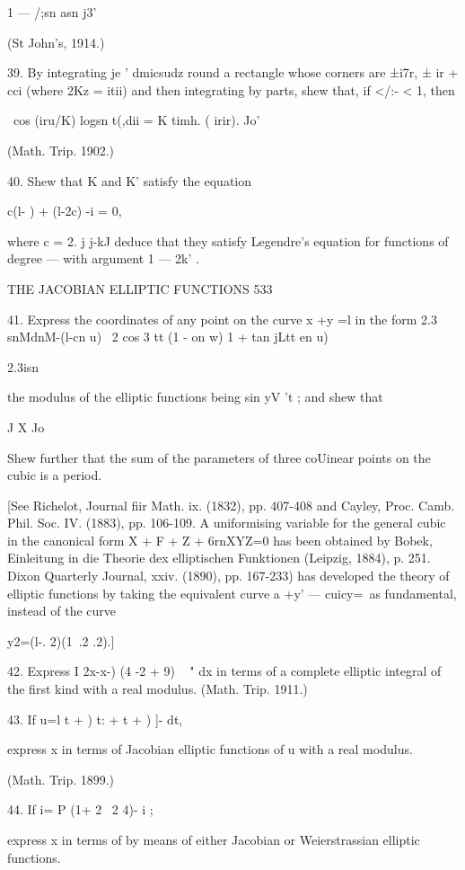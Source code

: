 1 — /;sn asn j3'

(St John's, 1914.)

39. By integrating je ' dmicsudz round a rectangle whose corners are
±i7r, ± ir + cci (where 2Kz = itii) and then integrating by parts,
shew that, if </:- < 1, then

\ cos (iru/K) logsn t(,dii = K timh. ( irir). Jo'

(Math. Trip. 1902.)

40. Shew that K and K' satisfy the equation

c(l- ) + (l-2c) -i = 0,

where c = 2. j j-kJ deduce that they satisfy Legendre's equation for
functions of degree — with argument 1 — 2k' .

THE JACOBIAN ELLIPTIC FUNCTIONS 533

41. Express the coordinates of any point on the curve x +y =l in the
form 2.3 snMdnM-(l-cn u) \ 2 cos 3 tt (1 - on w) 1 + tan jLtt en u)

2.3isn%

the modulus of the elliptic functions being sin yV 't ; and shew that

J X Jo

Shew further that the sum of the parameters of three coUinear points
on the cubic is a period.

[See Richelot, Journal fiir Math. ix. (1832), pp. 407-408 and Cayley,
Proc. Camb. Phil. Soc. IV. (1883), pp. 106-109. A uniformising
variable for the general cubic in the canonical form X + F + Z +
6rnXYZ=0 has been obtained by Bobek, Einleitung in die Theorie dex
elliptischen Funktionen (Leipzig, 1884), p. 251. Dixon Quarterly
Journal, xxiv. (1890), pp. 167-233) has developed the theory of
elliptic functions by taking the equivalent curve a +y' — cuicy=\ as
fundamental, instead of the curve

y2=(l-. 2)(1\ .2 .2).]

42. Express I 2x-x-) (4 -2 + 9) ~ " dx in terms of a complete elliptic
integral of the first kind with a real modulus. (Math. Trip. 1911.)

43. If u=l t + ) t: + t + ) ]- dt,

express x in terms of Jacobian elliptic functions of u with a real
modulus.

(Math. Trip. 1899.)

44. If i= P (1+ 2 \ 2 4)- i ;

express x in terms of by means of either Jacobian or Weierstrassian
elliptic functions.

